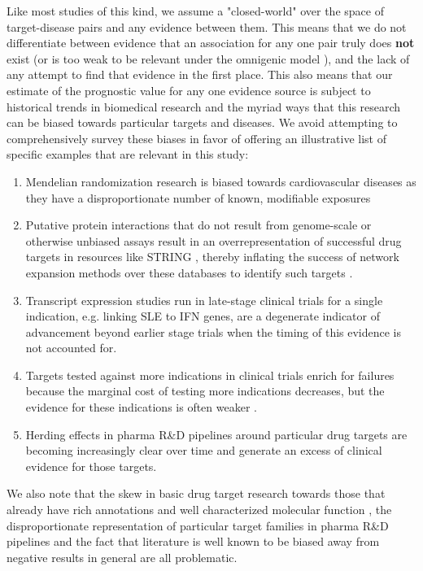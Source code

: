 \documentclass{article}
\begin{document}
Like most studies of this kind, we assume a "closed-world" \cite{Paliwal2020-hr} over the space of target-disease pairs and any evidence between them. This means that we do not differentiate between evidence that an association for any one pair truly does \textbf{not} exist (or is too weak to be relevant under the omnigenic model \cite{PMID:28622505}), and the lack of any attempt to find that evidence in the first place. This also means that our estimate of the prognostic value for any one evidence source is subject to historical trends in biomedical research and the myriad ways that this research can be biased towards particular targets and diseases. We avoid attempting to comprehensively survey these biases in favor of offering an illustrative list of specific examples that are relevant in this study:

\begin{enumerate}[topsep=0pt,itemsep=-1ex,partopsep=1ex,parsep=1ex]
\item Mendelian randomization research is biased towards cardiovascular diseases as they have a disproportionate number of known, modifiable exposures \cite{PMID:36736292}
\item Putative protein interactions that do not result from genome-scale or otherwise unbiased assays result in an overrepresentation of successful drug targets in resources like STRING \cite{PMID:36370105}, thereby inflating the success of network expansion methods over these databases to identify such targets \cite{Sadler2023-xd}.
\item Transcript expression studies run in late-stage clinical trials for a single indication, e.g. \cite{PMID:27723281} linking SLE to IFN genes, are a degenerate indicator of advancement beyond earlier stage trials when the timing of this evidence is not accounted for.
\item Targets tested against more indications in clinical trials enrich for failures because the marginal cost of testing more indications decreases, but the evidence for these indications is often weaker \cite{PMID:33262371}.
\item Herding effects in pharma R\&D pipelines around particular drug targets are becoming increasingly clear over time \cite{PMID:37117303} and generate an excess of clinical evidence for those targets.
\end{enumerate}

We also note that the skew in basic drug target research towards those that already have rich annotations and well characterized molecular function \cite{PMID:29358745}, the disproportionate representation of particular target families in pharma R\&D pipelines \cite{PMID:27910877,PPR:PPR7029} and the fact that literature is well known to be biased away from negative results in general \cite{PMID:32893970} are all problematic. 
\end{document}
